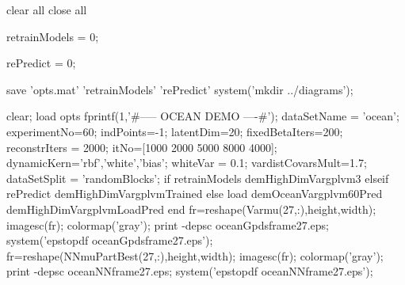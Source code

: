 \documentclass{article} %
\newenvironment{matlab}{\comment}{\endcomment}
\begin{document}
\begin{matlab}


clear all
close all

retrainModels = 0;

rePredict = 0;


save 'opts.mat' 'retrainModels' 'rePredict'
system('mkdir ../diagrams');

clear; load opts
fprintf(1,'\n\n#-----  OCEAN DEMO ----#\n');
dataSetName = 'ocean';
experimentNo=60;
indPoints=-1; latentDim=20;
fixedBetaIters=200; reconstrIters = 2000;
itNo=[1000 2000 5000 8000 4000];
dynamicKern={'rbf','white','bias'};
whiteVar = 0.1;  vardistCovarsMult=1.7;
dataSetSplit = 'randomBlocks';
if retrainModels
    demHighDimVargplvm3
elseif rePredict
    demHighDimVargplvmTrained
else
    load demOceanVargplvm60Pred
    demHighDimVargplvmLoadPred
end
fr=reshape(Varmu(27,:),height,width); imagesc(fr); colormap('gray'); %
print -depsc oceanGpdsframe27.eps; system('epstopdf oceanGpdsframe27.eps');
fr=reshape(NNmuPartBest(27,:),height,width); imagesc(fr); colormap('gray'); %
print -depsc oceanNNframe27.eps; system('epstopdf oceanNNframe27.eps');


\end{matlab}
\end{document}
